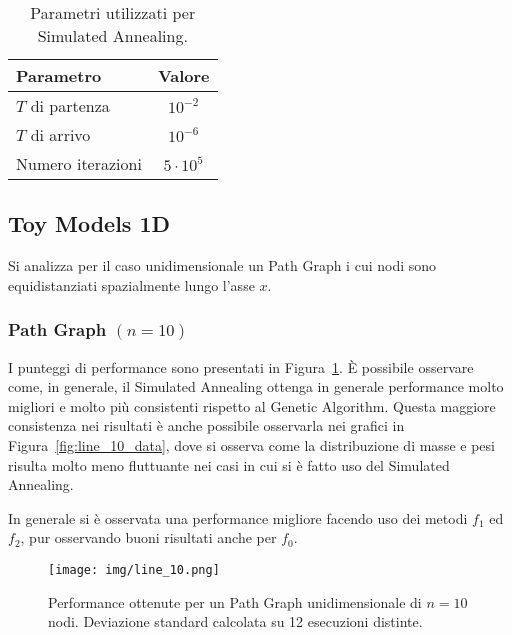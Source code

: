 \documentclass[10pt,a4paper]{article}
\begin{document}
\begin{table}[!htp]
    \centering
    \begin{tabular}{lc}
        \toprule
        Parametro & Valore \\
        \midrule
        \(T\) di partenza & \(10^{-2}\) \\
        \(T\) di arrivo & \(10^{-6}\) \\
        Numero iterazioni & \(5 \cdot 10^{5}\) \\
        \bottomrule
    \end{tabular}
    \caption{Parametri utilizzati per Simulated Annealing.}\label{tab:sa}
\end{table}

\subsection{Toy Models 1D}

Si analizza per il caso unidimensionale un Path Graph i cui nodi sono equidistanziati spazialmente lungo l'asse \(x\).

\subsubsection{Path Graph \((n = 10)\)}

I punteggi di performance sono presentati in Figura~\ref{fig:line_10_performance}.
È possibile osservare come, in generale, il Simulated Annealing ottenga in generale performance molto migliori e molto più consistenti rispetto al Genetic Algorithm.
Questa maggiore consistenza nei risultati è anche possibile osservarla nei grafici in Figura~\ref{fig:line_10_data}, dove si osserva come la distribuzione di masse e pesi risulta molto meno fluttuante nei casi in cui si è fatto uso del Simulated Annealing.

In generale si è osservata una performance migliore facendo uso dei metodi \(f_1\) ed \(f_2\), pur osservando buoni risultati anche per \(f_0\).

\begin{figure}[p]
    \centering
    \texttt{[image: img/line\_10.png]}
    \caption{Performance ottenute per un Path Graph unidimensionale di \(n=10\) nodi. Deviazione standard calcolata su 12 esecuzioni distinte.}\label{fig:line_10_performance}
\end{figure}
\end{document}
